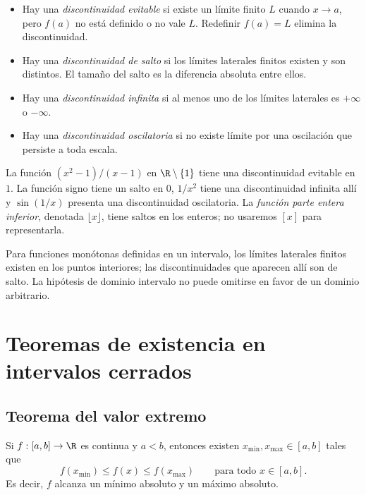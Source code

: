 \begin{itemize}
  \item Hay una \emph{discontinuidad evitable} si existe un límite finito
        \(L\) cuando \(x\to a\), pero \(f(a)\) no está definido o no vale
        \(L\). Redefinir \(f(a)=L\) elimina la discontinuidad.
  \item Hay una \emph{discontinuidad de salto} si los límites laterales
        finitos existen y son distintos. El tamaño del salto es la diferencia
        absoluta entre ellos.
  \item Hay una \emph{discontinuidad infinita} si al menos uno de los límites
        laterales es \(+\infty\) o \(-\infty\).
  \item Hay una \emph{discontinuidad oscilatoria} si no existe límite por una
        oscilación que persiste a toda escala.
\end{itemize}

La función \((x^2-1)/(x-1)\) en \(\R\setminus\{1\}\) tiene una
discontinuidad evitable en \(1\). La función signo tiene un salto en \(0\),
\(1/x^2\) tiene una discontinuidad infinita allí y \(\sin(1/x)\) presenta una
discontinuidad oscilatoria. La \emph{función parte entera inferior}, denotada
\(\lfloor x\rfloor\), tiene saltos en los enteros; no usaremos \([x]\) para
representarla.

Para funciones monótonas definidas en un intervalo, los límites laterales
finitos existen en los puntos interiores; las discontinuidades que aparecen
allí son de salto. La hipótesis de dominio intervalo no puede omitirse en favor
de un dominio arbitrario.

\section{Teoremas de existencia en intervalos cerrados}
\label{sec:teoremas-existencia}

\subsection{Teorema del valor extremo}

\begin{teorema}
Si \(f:[a,b]\to\R\) es continua y \(a<b\), entonces existen
\(x_{\min},x_{\max}\in[a,b]\) tales que
\[
  f(x_{\min})\le f(x)\le f(x_{\max})
  \qquad\text{para todo }x\in[a,b].
\]
Es decir, \(f\) alcanza un mínimo absoluto y un máximo absoluto.
\end{teorema}

